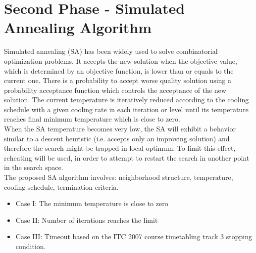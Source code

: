 \section{Second Phase - Simulated Annealing Algorithm}
\label{subsubsec:genetic-algorithm}
Simulated annealing (SA) has been widely used to solve combinatorial optimization problems. It accepts the new solution when the objective value, which is determined by an objective function, is lower than or equals to the current one. There is a probability to accept worse quality solution using a probability acceptance function which controls the acceptance of the new solution. The current temperature is iteratively reduced according to the cooling schedule with a given cooling rate in each iteration or level until its temperature reaches final minimum temperature which is close to zero.\\ 
When the SA temperature becomes very low, the SA will exhibit a behavior similar to a descent heuristic (i.e. accepts only an improving solution) and therefore the search might be trapped in local optimum. To limit this effect, reheating will be used, in order to attempt to restart the search in another point in the search space.\\
The proposed SA algorithm involves: neighborhood structure, temperature, cooling schedule, termination criteria.
\begin{itemize}
\item Case I: The minimum temperature is close to zero 
\item Case II: Number of iterations reaches the limit
\item Case III: Timeout based on the ITC 2007 course timetabling track 3 stopping condition.
\end{itemize}
